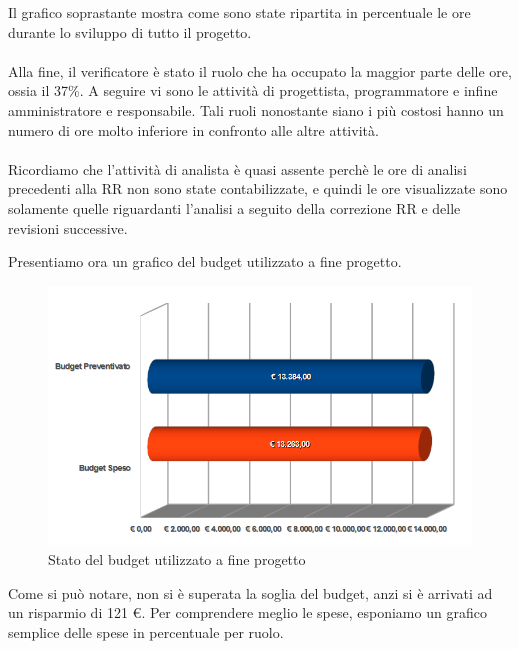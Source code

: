 Il grafico soprastante mostra come sono state ripartita in percentuale le ore
durante lo sviluppo di tutto il progetto.\\
\\
Alla fine, il verificatore \`e stato il ruolo che ha occupato la maggior parte
delle ore, ossia il 37\%. A seguire vi sono le attivit\`a di progettista,
programmatore e infine amministratore e responsabile. Tali ruoli nonostante
siano i pi\`u costosi hanno un numero di ore molto inferiore in confronto alle
altre attivit\`a.\\
\\
Ricordiamo che l'attivit\`a di analista \`e quasi assente perch\`e le ore di
analisi precedenti alla RR non sono state contabilizzate, e quindi le ore
visualizzate sono solamente quelle riguardanti l'analisi a seguito della
correzione RR e delle revisioni successive.

\newpage
Presentiamo ora un grafico del budget utilizzato a fine progetto.

\vspace{0cm}
\begin{figure}[htbp!]
  \centering
  \includegraphics[width=15cm, angle=0]{img/PP/BUDGET-FINE.png}
\caption{Stato del budget utilizzato a fine progetto}
\end{figure}
\vspace{0.5cm}

Come si pu\`o notare, non si \`e superata la soglia del budget, anzi si \`e
arrivati ad un risparmio di 121 \euro. Per comprendere meglio le spese, esponiamo
un grafico semplice delle spese in percentuale per ruolo.

